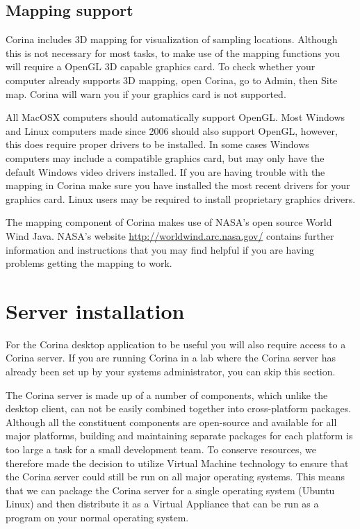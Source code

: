 \subsection{Mapping support}
Corina includes 3D mapping for visualization of sampling locations. Although this is not necessary for most tasks, to make use of the mapping functions you will require a OpenGL 3D capable graphics card. To check whether your computer already supports 3D mapping, open Corina, go to Admin, then Site map.  Corina will warn you if your graphics card is not supported.

All MacOSX computers should automatically support OpenGL.  Most Windows and Linux computers made since 2006 should also support OpenGL, however, this does require proper drivers to be installed. In some cases Windows computers may include a compatible graphics card, but may only have the default Windows video drivers installed.  If you are having trouble with the mapping in Corina make sure you have installed the most recent drivers for your graphics card.  Linux users may be required to install proprietary graphics drivers.  

The mapping component of Corina makes use of NASA's open source World Wind Java.  NASA's website \url{http://worldwind.arc.nasa.gov/} contains further information and instructions that you may find helpful if you are having problems getting the mapping to work.  

\section{Server installation}
For the Corina desktop application to be useful you will also require access to a Corina server.  If you are running Corina in a lab where the Corina server has already been set up by your systems administrator, you can skip this section.

The Corina server is made up of a number of components, which unlike the desktop client, can not be easily combined together into cross-platform packages.  Although all the constituent components are open-source and available for all major platforms, building and maintaining separate packages for each platform is too large a task for a small development team.  To conserve resources, we therefore made the decision to utilize Virtual Machine technology to ensure that the Corina server could still be run on all major operating systems.  This means that we can package the Corina server for a single operating system (Ubuntu Linux) and then distribute it as a Virtual Appliance that can be run as a program on your normal operating system. 

